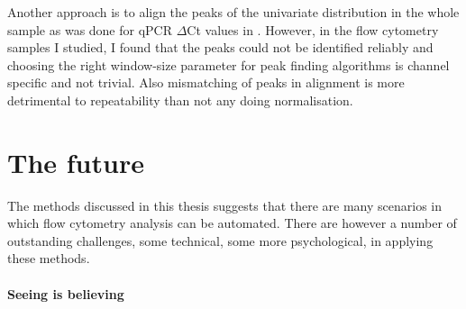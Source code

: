 Another approach is to align the peaks of the univariate distribution in the whole sample as was done for qPCR $\Delta$Ct values in .
However, in the flow cytometry samples I studied, I found that the peaks could not be identified reliably and choosing the right window-size parameter for peak finding algorithms is channel specific and not trivial.
Also mismatching of peaks in alignment is more detrimental to repeatability than not any doing normalisation.




\section{ The future }

The methods discussed in this thesis suggests that there are many scenarios in which flow cytometry analysis can be automated.
There are however a number of outstanding challenges, some technical, some more psychological, in applying these methods.

\paragraph{Seeing is believing}

